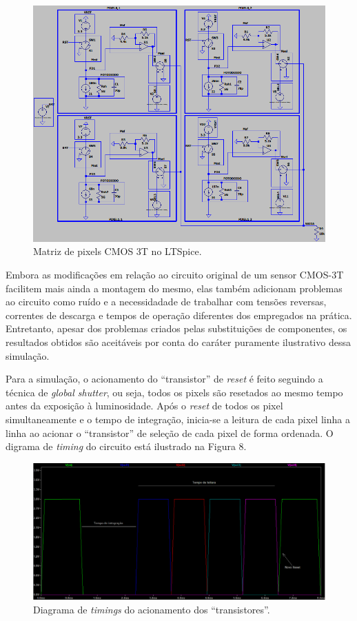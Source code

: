 \documentclass[10pt,a4paper,twocolumn]{article}
\begin{document}
	\begin{figure}[h]
	\centering
	\includegraphics[scale=0.43]{imagens/matriz_simulada.png}
	\caption{Matriz de pixels CMOS 3T no LTSpice.}	
	\end{figure}

	Embora as modificações em relação ao circuito original de um sensor CMOS-3T facilitem mais ainda a montagem do mesmo, elas também adicionam problemas ao circuito como ruído e a necessidadade de trabalhar com tensões reversas, correntes de descarga e tempos de operação diferentes dos empregados na prática. Entretanto, apesar dos problemas criados pelas substituições de componentes, os resultados obtidos são aceitáveis por conta do caráter puramente ilustrativo dessa simulação.

	Para a simulação, o acionamento do ``transistor'' de \textit{reset} é feito seguindo a técnica de \textit{global shutter}, ou seja, todos os pixels são resetados ao mesmo tempo antes da exposição à luminosidade. Após o \textit{reset} de todos os pixel simultaneamente e o tempo de integração, inicia-se a leitura de cada pixel linha a linha ao acionar o ``transistor'' de seleção de cada pixel de forma ordenada. O digrama de \textit{timing} do circuito está ilustrado na Figura 8.
	
	\begin{figure}[H]
	\centering
	\includegraphics[scale=0.258]{imagens/timings.png}
	\caption{Diagrama de \textit{timings} do acionamento dos ``transistores''.}
	\end{figure}
\end{document}
